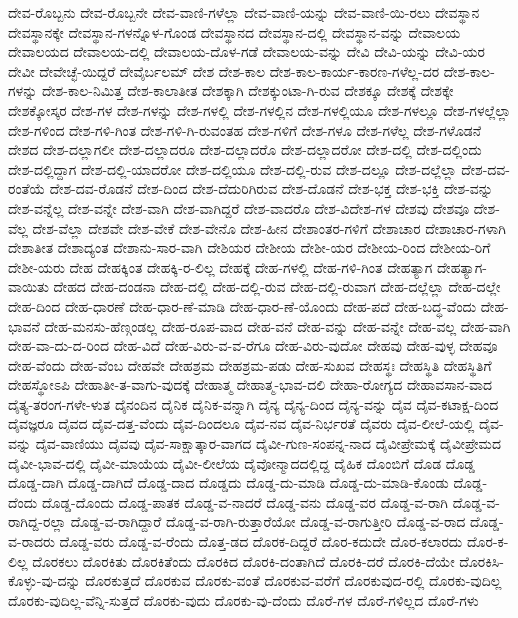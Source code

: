 {ದೇವ-ರೊಬ್ಬನು
ದೇವ-ರೊಬ್ಬನೇ
ದೇವ-ವಾಣಿ-ಗಳೆಲ್ಲಾ
ದೇವ-ವಾಣಿ-ಯನ್ನು
ದೇವ-ವಾಣಿ-ಯಿ-ರಲು
ದೇವಸ್ಥಾನ
ದೇವಸ್ಥಾನಕ್ಕೇ
ದೇವಸ್ಥಾನ-ಗಳನ್ನೊಳ-ಗೊಂಡ
ದೇವಸ್ಥಾನದ
ದೇವಸ್ಥಾನ-ದಲ್ಲಿ
ದೇವಸ್ಥಾನ-ವನ್ನು
ದೇವಾಲಯ
ದೇವಾಲಯದ
ದೇವಾಲಯ-ದಲ್ಲಿ
ದೇವಾಲಯ-ದೊಳ-ಗಡೆ
ದೇವಾಲಯ-ವನ್ನು
ದೇವಿ
ದೇವಿ-ಯನ್ನು
ದೇವಿ-ಯರ
ದೇವೀ
ದೇವೇಚ್ಛೆ-ಯಿದ್ದರೆ
ದೇವೈರ್ಬಲಮ್
ದೇಶ
ದೇಶ-ಕಾಲ
ದೇಶ-ಕಾಲ-ಕಾರ್ಯ-ಕಾರಣ-ಗಳೆಲ್ಲ-ದರ
ದೇಶ-ಕಾಲ-ಗಳನ್ನು
ದೇಶ-ಕಾಲ-ನಿಮಿತ್ತ
ದೇಶ-ಕಾಲಾತೀತ
ದೇಶಕ್ಕಾಗಿ
ದೇಶಕ್ಕುಂಟಾ-ಗಿ-ರುವ
ದೇಶಕ್ಕೂ
ದೇಶಕ್ಕೆ
ದೇಶಕ್ಕೇ
ದೇಶಕ್ಕೋಸ್ಕರ
ದೇಶ-ಗಳ
ದೇಶ-ಗಳನ್ನು
ದೇಶ-ಗಳಲ್ಲಿ
ದೇಶ-ಗಳಲ್ಲಿನ
ದೇಶ-ಗಳಲ್ಲಿಯೂ
ದೇಶ-ಗಳಲ್ಲೂ
ದೇಶ-ಗಳಲ್ಲೆಲ್ಲಾ
ದೇಶ-ಗಳಿಂದ
ದೇಶ-ಗಳಿ-ಗಿಂತ
ದೇಶ-ಗಳಿ-ಗಿ-ರುವಂತಹ
ದೇಶ-ಗಳಿಗೆ
ದೇಶ-ಗಳೂ
ದೇಶ-ಗಳೆಲ್ಲ
ದೇಶ-ಗಳೊಡನೆ
ದೇಶದ
ದೇಶ-ದಲ್ಲಾಗಲೀ
ದೇಶ-ದಲ್ಲಾದರೂ
ದೇಶ-ದಲ್ಲಾದರೊ
ದೇಶ-ದಲ್ಲಾದರೋ
ದೇಶ-ದಲ್ಲಿ
ದೇಶ-ದಲ್ಲಿಂದು
ದೇಶ-ದಲ್ಲಿದ್ದಾಗ
ದೇಶ-ದಲ್ಲಿ-ಯಾದರೋ
ದೇಶ-ದಲ್ಲಿಯೂ
ದೇಶ-ದಲ್ಲಿ-ರುವ
ದೇಶ-ದಲ್ಲೂ
ದೇಶ-ದಲ್ಲೆಲ್ಲಾ
ದೇಶ-ದವ-ರಂತೆಯೆ
ದೇಶ-ದವ-ರೊಡನೆ
ದೇಶ-ದಿಂದ
ದೇಶ-ದೆದುರಿಗಿರುವ
ದೇಶ-ದೊಡನೆ
ದೇಶ-ಭಕ್ತ
ದೇಶ-ಭಕ್ತಿ
ದೇಶ-ವನ್ನು
ದೇಶ-ವನ್ನೆಲ್ಲ
ದೇಶ-ವನ್ನೇ
ದೇಶ-ವಾಗಿ
ದೇಶ-ವಾಗಿದ್ದರೆ
ದೇಶ-ವಾದರೊ
ದೇಶ-ವಿದೇಶ-ಗಳ
ದೇಶವು
ದೇಶವೂ
ದೇಶ-ವೆಲ್ಲ
ದೇಶ-ವೆಲ್ಲಾ
ದೇಶವೇ
ದೇಶ-ವೇಕೆ
ದೇಶ-ವೇನೊ
ದೇಶ-ಹೀನ
ದೇಶಾಂತರ-ಗಳಿಗೆ
ದೇಶಾಚಾರ
ದೇಶಾಚಾರ-ಗಳಾಗಿ
ದೇಶಾತೀತ
ದೇಶಾದ್ಯಂತ
ದೇಶಾನು-ಸಾರ-ವಾಗಿ
ದೇಶಿಯರ
ದೇಶೀಯ
ದೇಶೀ-ಯರ
ದೇಶೀಯ-ರಿಂದ
ದೇಶೀಯ-ರಿಗೆ
ದೇಶೀ-ಯರು
ದೇಹ
ದೇಹಕ್ಕಿಂತ
ದೇಹಕ್ಕಿ-ರ-ಲಿಲ್ಲ
ದೇಹಕ್ಕೆ
ದೇಹ-ಗಳಲ್ಲಿ
ದೇಹ-ಗಳಿ-ಗಿಂತ
ದೇಹತ್ಯಾಗ
ದೇಹತ್ಯಾಗ-ವಾಯಿತು
ದೇಹದ
ದೇಹ-ದಂಡನಾ
ದೇಹ-ದಲ್ಲಿ
ದೇಹ-ದಲ್ಲಿ-ರುವ
ದೇಹ-ದಲ್ಲಿ-ರುವಾಗ
ದೇಹ-ದಲ್ಲೆಲ್ಲಾ
ದೇಹ-ದಲ್ಲೇ
ದೇಹ-ದಿಂದ
ದೇಹ-ಧಾರಣೆ
ದೇಹ-ಧಾರ-ಣೆ-ಮಾಡಿ
ದೇಹ-ಧಾರ-ಣೆ-ಯೊಂದು
ದೇಹ-ಪದೆ
ದೇಹ-ಬದ್ಧ-ವೆಂದು
ದೇಹ-ಭಾವನೆ
ದೇಹ-ಮನಸು-ಹೆಣ್ಗಂಡಲ್ಲ
ದೇಹ-ರೂಪ-ವಾದ
ದೇಹ-ವನೆ
ದೇಹ-ವನ್ನು
ದೇಹ-ವನ್ನೇ
ದೇಹ-ವಲ್ಲ
ದೇಹ-ವಾಗಿ
ದೇಹ-ವಾ-ದು-ದ-ರಿಂದ
ದೇಹ-ವಿದೆ
ದೇಹ-ವಿರು-ವ-ವ-ರೆಗೂ
ದೇಹ-ವಿರು-ವುದೋ
ದೇಹವು
ದೇಹ-ವುಳ್ಳ
ದೇಹವೂ
ದೇಹ-ವೆಂದು
ದೇಹ-ವೆಂಬ
ದೇಹವೇ
ದೇಹಶ್ರಮ
ದೇಹಶ್ರಮ-ಪಡು
ದೇಹ-ಸುಖವ
ದೇಹಸ್ಥಃ
ದೇಹಸ್ಥಿತಿ
ದೇಹಸ್ಥಿತಿಗೆ
ದೇಹಸ್ಥೋಽಪಿ
ದೇಹಾತೀ-ತ-ವಾಗು-ವುದಕ್ಕೆ
ದೇಹಾತ್ಮ
ದೇಹಾತ್ಮ-ಭಾವ-ದಲಿ
ದೇಹಾ-ರೋಗ್ಯದ
ದೇಹಾವಸಾನ-ವಾದ
ದೈತ್ಯ-ತರಂಗ-ಗಳೇ-ಳುತ
ದೈನಂದಿನ
ದೈನಿಕ
ದೈನಿಕ-ವನ್ನಾಗಿ
ದೈನ್ಯ
ದೈನ್ಯ-ದಿಂದ
ದೈನ್ಯ-ವನ್ನು
ದೈವ
ದೈವ-ಕಟಾಕ್ಷ-ದಿಂದ
ದೈವಜ್ಞರೂ
ದೈವದ
ದೈವ-ದತ್ತ-ವೆಂದು
ದೈವ-ದಿಂದಲೂ
ದೈವ-ನವ
ದೈವ-ನಿರ್ಭರತೆ
ದೈವರು
ದೈವ-ಲೀಲೆ-ಯಲ್ಲಿ
ದೈವ-ವನ್ನು
ದೈವ-ವಾಣಿಯು
ದೈವವು
ದೈವ-ಸಾಕ್ಷಾತ್ಕಾರ-ವಾಗದ
ದೈವೀ-ಗುಣ-ಸಂಪನ್ನ-ನಾದ
ದೈವೀಪ್ರೇಮಕ್ಕೆ
ದೈವೀಪ್ರೇಮದ
ದೈವೀ-ಭಾವ-ದಲ್ಲಿ
ದೈವೀ-ಮಾಯೆಯ
ದೈವೀ-ಲೀಲೆಯ
ದೈವೋನ್ಮಾದದಲ್ಲಿದ್ದ
ದೈಹಿಕ
ದೊಂಬಿಗೆ
ದೊಡ
ದೊಡ್ಡ
ದೊಡ್ಡ-ದಾಗಿ
ದೊಡ್ಡ-ದಾಗಿದೆ
ದೊಡ್ಡ-ದಾದ
ದೊಡ್ಡದು
ದೊಡ್ಡ-ದು-ಮಾಡಿ
ದೊಡ್ಡ-ದು-ಮಾಡಿ-ಕೊಂಡು
ದೊಡ್ಡ-ದೆಂದು
ದೊಡ್ಡ-ದೊಂದು
ದೊಡ್ಡ-ಪಾತಕ
ದೊಡ್ಡ-ವ-ನಾದರೆ
ದೊಡ್ಡ-ವನು
ದೊಡ್ಡ-ವರ
ದೊಡ್ಡ-ವ-ರಾಗಿ
ದೊಡ್ಡ-ವ-ರಾಗಿದ್ದ-ರಲ್ಲಾ
ದೊಡ್ಡ-ವ-ರಾಗಿದ್ದಾರೆ
ದೊಡ್ಡ-ವ-ರಾಗಿ-ರುತ್ತಾರೆಯೋ
ದೊಡ್ಡ-ವ-ರಾಗುತ್ತೀರಿ
ದೊಡ್ಡ-ವ-ರಾದ
ದೊಡ್ಡ-ವ-ರಾದರು
ದೊಡ್ಡ-ವರು
ದೊಡ್ಡ-ವ-ರೆಂದು
ದೊತ್ತ-ಡದ
ದೊರಕ-ದಿದ್ದರೆ
ದೊರ-ಕದುದೇ
ದೊರ-ಕಲಾರದು
ದೊರ-ಕ-ಲಿಲ್ಲ
ದೊರಕಲು
ದೊರಕಿತು
ದೊರಕಿತೆಂದು
ದೊರಕಿದ
ದೊರಕಿ-ದಂತಾಗಿದೆ
ದೊರಕಿ-ದರೆ
ದೊರಕಿ-ದೆಯೇ
ದೊರಕಿಸಿ-ಕೊಳ್ಳು-ವು-ದನ್ನು
ದೊರಕುತ್ತದೆ
ದೊರಕುವ
ದೊರಕು-ವಂತೆ
ದೊರಕುವ-ವರೆಗೆ
ದೊರಕುವುದ-ರಲ್ಲಿ
ದೊರಕು-ವುದಿಲ್ಲ
ದೊರಕು-ವುದಿಲ್ಲ-ವೆನ್ನಿ-ಸುತ್ತದೆ
ದೊರಕು-ವುದು
ದೊರಕು-ವು-ದೆಂದು
ದೊರೆ-ಗಳ
ದೊರೆ-ಗಳಿಲ್ಲದ
ದೊರೆ-ಗಳು
}
